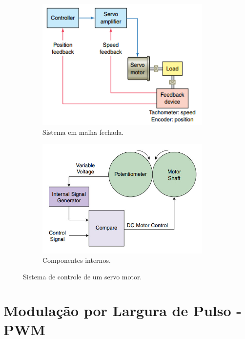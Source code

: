 \begin{figure}[h]
	\centering
	\begin{subfigure}{.5\textwidth}
		\includegraphics[width=0.95\textwidth]{figuras/servo_closed_loop.png}
		\caption{Sistema em malha fechada.}
		\label{fig:servo_closed_loop}
	\end{subfigure}%
	\begin{subfigure}{.5\textwidth}
		\includegraphics[width=0.95\textwidth]{figuras/inside_a_servo.jpg}
		\caption{Componentes internos.}
		\label{fig:insideaservo}
	\end{subfigure}
	\caption{Sistema de controle de um servo motor.}
\end{figure}

\section{Modulação por Largura de Pulso - PWM}
\label{sec:pwm}

